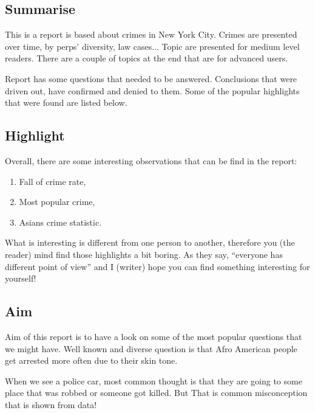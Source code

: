 \documentclass{article}\usepackage[]{graphicx}\usepackage[]{color}
\begin{document}
        \subsection{Summarise}
          This is a report is based about crimes in New York City. Crimes are presented over time, by               perps’ diversity, law cases... Topic are presented for medium level readers. There are a couple           of topics at the end that are for advanced users.\vspace{5mm}
          
          Report has some questions that needed to be answered. Conclusions that were driven out, have              confirmed and denied to them. Some of the popular highlights that were found are listed below. 

        \subsection{Highlight}
          Overall, there are some interesting observations that can be find in the report:
          \begin{enumerate} 
            \item Fall of crime rate,
            \item Most popular crime, 
            \item Asians crime statistic.
          \end{enumerate}
      
        What is interesting is different from one person to another, therefore you (the reader) mind find         those highlights a bit boring. As they say, “everyone has different point of view” and I (writer)         hope you can find something interesting for yourself!
      
        \subsection{Aim}
        Aim of this report is to have a look on some of the most popular questions that we might have.            Well known and diverse question is that Afro American people get arrested more often due to their         skin tone.\vspace{5mm}
      
        When we see a police car, most common thought is that they are going to some place that was robbed         or someone got killed. But That is common misconception that is shown from data! 
      
\end{document}
